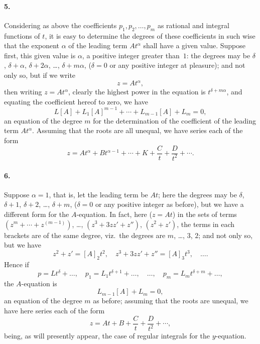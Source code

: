 \documentclass[11pt,a4paper]{book}
\begin{document}
\paragraph{5.} Considering as above the coefficients $p_{1}, p_{2}, \ldots, p_{m}$ as rational and integral functions of $t$, it is easy to determine the degrees of these coefficients in such wise that the exponent $\alpha$ of the leading term $At^{\alpha}$ shall have a given value. Suppose first, this given value is $\alpha$, a positive integer greater than~$1$: the degrees may be $\delta$, $\delta + \alpha$, $\delta + 2\alpha$, \ldots, $\delta + m\alpha$, ($\delta = 0$ or any positive integer at pleasure); and not only so, but if we write
\[
z = At^{\alpha},
\]
then writing $z = At^{\alpha}$, clearly the highest power in the equation is $t^{\delta + m\alpha}$, and equating the coefficient hereof to zero, we have
\[
L[A] + L_{1}[A]^{m-1} + \cdots + L_{m-1}[A] + L_{m} = 0,
\]
an equation of the degree $m$ for the determination of the coefficient of the leading term $At^{\alpha}$. Assuming that the roots are all unequal, we have series each of the form
\[
z = At^{\alpha} + Bt^{\alpha-1} + \cdots + K + \frac{C}{t} + \frac{D}{t^{2}} + \cdots.
\]

\paragraph{6.} Suppose $\alpha = 1$, that is, let the leading term be $At$; here the degrees may be $\delta$, $\delta + 1$, $\delta + 2$, \ldots, $\delta + m$, ($\delta = 0$ or any positive integer as before), but we have a different form for the $A$-equation. In fact, here ($z = At$) in the sets of terms $(z^{m} + \cdots + z^{(m-1)})$, \ldots, $(z^{3} + 3zz' + z'')$, $(z^{2} + z')$, the terms in each brackets are of the same degree, viz.\ the degrees are $m$, \ldots, $3$, $2$; and not only so, but we have
\[
z^{2} + z' = [A]_{2}t^{2}, \quad z^{3} + 3zz' + z'' = [A]_{3}t^{3}, \quad \ldots.
\]
Hence if
\[
p = Lt^{\delta} + \ldots, \quad p_{1} = L_{1}t^{\delta+1} + \ldots, \quad \ldots, \quad p_{m} = L_{m}t^{\delta+m} + \ldots,
\]
the $A$-equation is
\[
L_{m-1}[A] + L_{m} = 0,
\]
an equation of the degree $m$ as before; assuming that the roots are unequal, we have here series each of the form
\[
z = At + B + \frac{C}{t} + \frac{D}{t^{2}} + \cdots,
\]
being, as will presently appear, the case of regular integrals for the $y$-equation.
\end{document}
